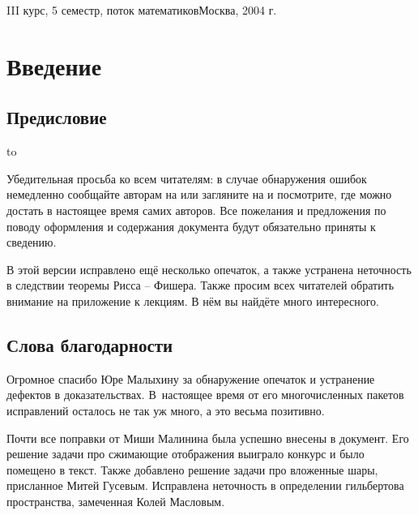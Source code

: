 \documentclass[a4paper]{article}
\begin{document}
{III курс, 5 семестр, поток математиков}{Москва, 2004 г.} \pagebreak

\pagestyle{plain}
\tableofcontents
\pagebreak

\section*{Введение}

\subsection*{Предисловие}

\hbox to 

\vskip 5pt

Убедительная просьба ко всем читателям: в случае обнаружения ошибок
немедленно сообщайте авторам на \dmvnmail{} или загляните на \dmvnwebsite{} и посмотрите, где можно
достать в настоящее время самих авторов. Все пожелания и предложения по поводу оформления
и содержания документа будут обязательно приняты к сведению.

В этой версии исправлено ещё несколько опечаток, а также устранена неточность в следствии теоремы Рисса -- Фишера.
Также просим всех читателей обратить внимание на приложение к лекциям. В нём вы найдёте много интересного.

\subsection*{Слова благодарности}

Огромное спасибо Юре Малыхину за обнаружение опечаток и устранение дефектов в доказательствах.
В~настоящее время от его многочисленных пакетов исправлений осталось не так уж много,
а это весьма позитивно.

Почти все поправки от Миши Малинина была успешно внесены в документ. Его решение задачи
про сжимающие отображения выиграло конкурс и было помещено в текст.
Также добавлено решение задачи про вложенные шары, присланное Митей Гусевым.
Исправлена неточность в определении гильбертова пространства, замеченная Колей Масловым.
\end{document}
